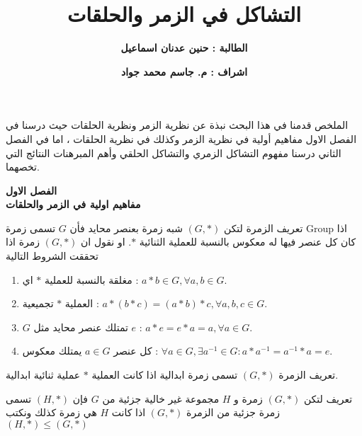 

\title{\textbf{التشاكل في الزمر والحلقات}}
\author{\textbf{الطالبة : حنين عدنان اسماعيل}}
\date{\textbf{اشراف : م. جاسم محمد جواد}}


	\abovedisplayskip=0pt
	\belowdisplayskip=0pt
	\maketitle
	
	\timesfont
	
	\begin{frame}{الملخص}
		قدمنا في هذا البحث نبذة عن نظرية الزمر ونظرية الحلقات حيث درسنا في الفصل الاول مفاهيم أولية في نظرية الزمر وكذلك في نظرية الحلقات ، اما في الفصل الثاني درسنا مفهوم التشاكل الزمري والتشاكل الحلقي وأهم المبرهنات النتائج التي تخصهما. 
	\end{frame}
	
	\begin{frame}
		\Huge
		\begin{center}
			\textbf{الفصل الاول}\\
			\textbf{مفاهيم اولية في الزمر والحلقات}
		\end{center}
	\end{frame}
	
	\begin{frame}
		\begin{exampleblock}{تعريف الزمرة}
				لتكن $(G, *)$ شبه زمرة بعنصر محايد فأن $G$ تسمى زمرة Group اذا كان كل عنصر فيها له معكوس بالنسبة للعملية الثنائية $*$. او نقول ان $(G, *)$ زمرة اذا تحققت الشروط التالية
			\begin{enumerate}
				\item مغلقة بالنسبة للعملية $*$ اي : $a*b \in G , \forall a, b\in G$.
				\item العملية $*$ تجميعية : $a*(b*c) = (a*b)*c , \forall a, b,c\in G$.
				\item $G$ تمتلك عنصر محايد مثل $e$ : $a*e =e*a=a, \forall a\in G$.
				\item كل عنصر $a\in G$ يمتلك معكوس : $\forall a\in G, \exists a^{-1}\in G : a*a^{-1}=a^{-1}*a=e$.
			\end{enumerate}
		\end{exampleblock}
		
		\pause
		\begin{exampleblock}{تعريف}
				الزمرة $(G, *)$ تسمى زمرة ابدالية اذا كانت العملية $*$ عملية ثنائية ابدالية.
		\end{exampleblock}
		
		\pause
		\begin{exampleblock}{تعريف}
				لتكن $(G, *)$ زمرة و $H$ مجموعة غير خالية جزئية من $G$ فإن $(H, *)$ تسمى زمرة جزئية من الزمرة $(G, *)$ اذا كانت $H$ هي زمرة كذلك ونكتب $(H, *)\leq (G, *)$
		\end{exampleblock}
	\end{frame}
	
